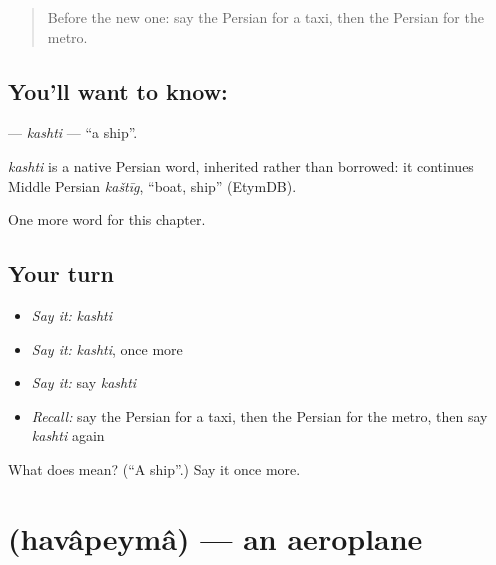 \label{lesson:FA-C117-kashti}



\begin{quote}
Before the new one: say the Persian for a taxi, then the Persian for the metro.
\end{quote}

\subsection*{You'll want to know: }
\textbf{} — \emph{kashti} — \textquotedblleft{}a ship\textquotedblright{}.

\begin{cousinweb}
\emph{kashti} is a native Persian word, inherited rather than borrowed: it continues Middle Persian \emph{kaštīg}, \textquotedblleft{}boat, ship\textquotedblright{} (EtymDB).
\end{cousinweb}

\begin{grammarlens}[title={What you've built}]
One more word for this chapter.
\end{grammarlens}

\subsection*{Your turn}
\begin{itemize}
\raggedright
  \item \emph{Say it:} \emph{kashti}
  \item \emph{Say it:} \emph{kashti}, once more
  \item \emph{Say it:} say \emph{kashti}
  \item \emph{Recall:} say the Persian for a taxi, then the Persian for the metro, then say \emph{kashti} again
\end{itemize}

\begin{tcolorbox}[breakable,colback=teal!4,colframe=teal!35!black,title={Before you move on}]
What does  mean? (\textquotedblleft{}A ship\textquotedblright{}.) Say it once more.
\end{tcolorbox}
\section[\texorpdfstring{\fa{هواپیما} (havâpeymâ)}{هواپیما (havâpeymâ)}]{ (havâpeymâ) — an aeroplane}

\label{lesson:FA-C117-havapeyma}



